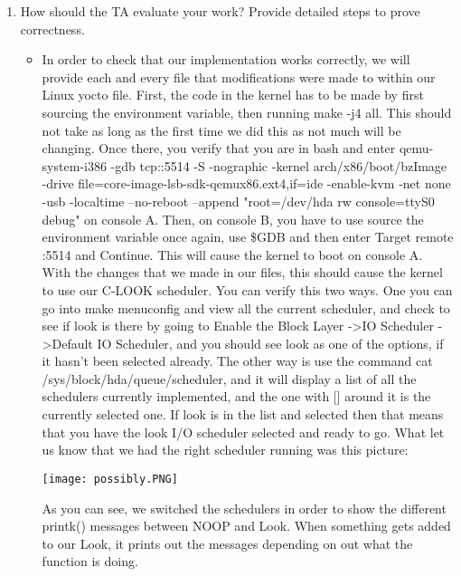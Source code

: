 \documentclass[journal,10pt,onecolumn,compsoc]{IEEEtran} \usepackage[margin=1.0in]{geometry} \usepackage{pdfpages}
\begin{document}
\begin {enumerate}
\begin{itemize}
    \end{itemize}
\item How should the TA evaluate your work? Provide detailed steps to prove correctness.
	\begin{itemize}
    	\item In order to check that our implementation works correctly, we will provide each and every file that modifications were made to within our Linux yocto file. First, the code in the kernel has to be made by first sourcing the environment variable, then running make -j4 all. This should not take as long as the first time we did this as not much will be changing. Once there, you verify that you are in bash and enter qemu-system-i386 -gdb tcp::5514 -S -nographic -kernel arch/x86/boot/bzImage -drive file=core-image-lsb-sdk-qemux86.ext4,if=ide -enable-kvm -net none -usb -localtime --no-reboot --append "root=/dev/hda rw console=ttyS0 debug" on console A. Then, on console B, you have to use source the environment variable once again, use \$GDB and then enter Target remote :5514 and Continue. This will cause the kernel to boot on console A. With the changes that we made in our files, this should cause the kernel to use our C-LOOK scheduler. You can verify this two ways. One you can go into make menuconfig and view all the current scheduler, and check to see if look is there by going to Enable the Block Layer -\textgreater IO Scheduler -\textgreater Default IO Scheduler, and you should see look as one of the options, if it hasn't been selected already. The other way is use the command cat /sys/block/hda/queue/scheduler, and it will display a list of all the schedulers currently implemented, and the one with [] around it is the currently selected one. If look is in the list and selected then that means that you have the look I/O scheduler selected and ready to go. What let us know that we had the right scheduler running was this picture:
        
       \texttt{[image: possibly.PNG]}
       
As you can see, we switched the schedulers in order to show the different printk() messages between NOOP and Look. When something gets added to our Look, it prints out the messages depending on out what the function is doing.

    \end{itemize}

\end{enumerate}
\end{document}
